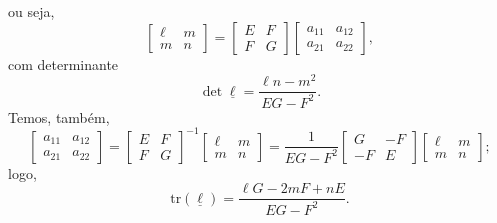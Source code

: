 \documentclass[../differential_geometry.tex]{subfiles}
\begin{document}
ou seja,
\[
	\begin{bmatrix}
		\ell & m \\
		m    & n
	\end{bmatrix} = \begin{bmatrix}
		E & F \\
		F & G
	\end{bmatrix} \begin{bmatrix}
		a_{11} & a_{12} \\
		a_{21} & a_{22}
	\end{bmatrix},
\]
com determinante
\[
	\det{\underline{\ell }} = \frac{\ell n - m^{2}}{EG - F^{2}}.
\]
Temos, também,
\[
	\begin{bmatrix}
		a_{11} & a_{12} \\
		a_{21} & a_{22}
	\end{bmatrix} = \begin{bmatrix}
		E & F \\
		F & G
	\end{bmatrix}^{-1}\begin{bmatrix}
		\ell & m \\
		m    & n
	\end{bmatrix} = \frac{1}{EG-F^{2}}\begin{bmatrix}
		G  & -F \\
		-F & E
	\end{bmatrix}\begin{bmatrix}
		\ell & m \\
		m    & n
	\end{bmatrix};
\]
logo,
\[
	\mathrm{tr}(\underline{\ell }) = \frac{\ell G - 2mF + nE}{EG-F^{2}}.
\]
\end{document}
